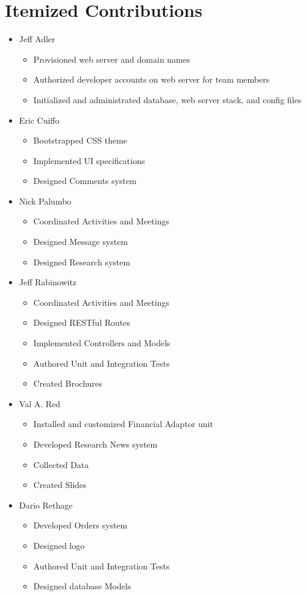 \section{Itemized Contributions}

\begin{itemize}
\item Jeff Adler
	\begin{itemize}
	\item Provisioned web server and domain names
	\item Authorized developer accounts on web server for team members
	\item Initialized and administrated database, web server stack, and config files
	\end{itemize}
\item Eric Cuiffo
	\begin{itemize}
	\item Bootstrapped CSS theme
	\item Implemented UI specifications
	\item Designed Comments system
	\end{itemize}
\item Nick Palumbo
	\begin{itemize}
	\item Coordinated Activities and Meetings
	\item Designed Message system
	\item Designed Research system
	\end{itemize}
\item Jeff Rabinowitz
	\begin{itemize}
	\item Coordinated Activities and Meetings
	\item Designed RESTful Routes
	\item Implemented Controllers and Models
	\item Authored Unit and Integration Tests
	\item Created Brochures
	\end{itemize}
\item Val A. Red
	\begin{itemize}
	\item Installed and customized Financial Adaptor unit
	\item Developed Research News system
	\item Collected Data
	\item Created Slides
	\end{itemize}
\item Dario Rethage
	\begin{itemize}
	\item Developed Orders system
	\item Designed logo
	\item Authored Unit and Integration Tests
	\item Designed database Models
	\end{itemize}
\end{itemize}
